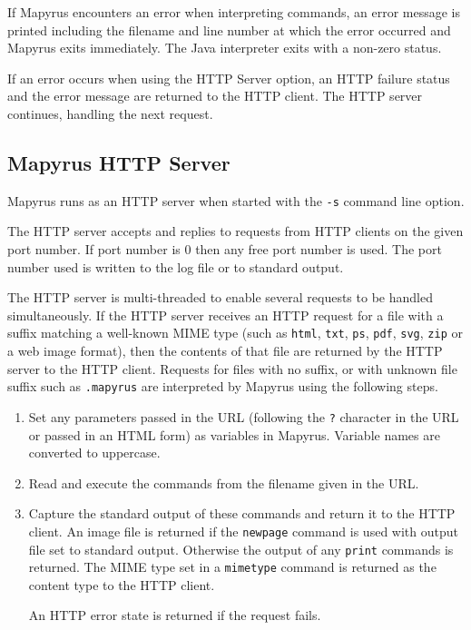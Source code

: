 If Mapyrus encounters an error when interpreting commands,
an error message is printed including the filename and line number
at which the error occurred and Mapyrus exits immediately.
The Java interpreter exits with a non-zero status.

If an error occurs when using the HTTP Server
option, an HTTP failure status and the error message
are returned to the HTTP client.  The HTTP server continues,
handling the next request.

\subsection{Mapyrus HTTP Server}

Mapyrus runs as an HTTP server when started with the \texttt{-s} command line
option.

The HTTP server accepts and replies to requests from HTTP clients on the given
port number.  If port number is 0 then any free port number is used.  The port
number used is written to the log file or to standard output.

The HTTP server is multi-threaded to enable several requests to be handled
simultaneously.  If the HTTP server receives an HTTP request for a file with a
suffix matching a well-known MIME type (such as \texttt{html}, \texttt{txt},
\texttt{ps}, \texttt{pdf}, \texttt{svg}, \texttt{zip}
or a web image format), then the
contents of that file are returned by the HTTP server to the HTTP client.
Requests for files with no suffix, or with unknown file suffix
such as \texttt{.mapyrus} are interpreted
by Mapyrus using the following steps.

\begin{enumerate}
\item
Set any parameters passed in the URL (following the \texttt{?} character in
the URL or passed in an HTML form) as variables in Mapyrus.
Variable names are converted to uppercase.
\item
Read and execute the commands from the filename given in the URL.
\item
Capture the standard output of these commands and return it to the
HTTP client.
An image file is returned if the
\texttt{newpage} command is used with output file set
to standard output.
Otherwise the output of any \texttt{print} commands is returned.
The MIME type set in a \texttt{mimetype} command is returned as
the content type to the HTTP client.

An HTTP error state is returned if the request fails.
\end{enumerate}

